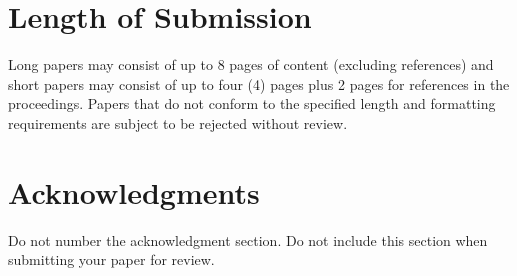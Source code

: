 \documentclass[11pt]{article}
\begin{document}
\section{Length of Submission}
\label{sec:length}

Long papers may consist of up to 8 pages of content (excluding
references) and short papers may consist of up to 
four (4) pages plus 2 pages for references in the proceedings.  Papers that do not conform to the
specified length and formatting requirements are subject to be
rejected without review.




\section*{Acknowledgments}

Do not number the acknowledgment section. Do not include this section
when submitting your paper for review.



\end{document}
